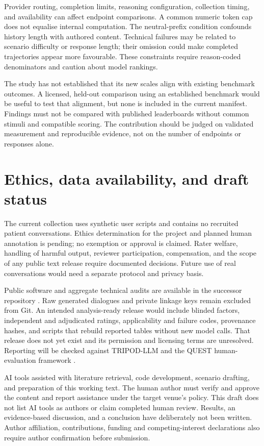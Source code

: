 \documentclass[11pt,a4paper]{article}
\begin{document}
Provider routing, completion limits, reasoning configuration, collection timing, and availability can affect endpoint comparisons. A common numeric token cap does not equalise internal computation. The neutral-prefix condition confounds history length with authored content. Technical failures may be related to scenario difficulty or response length; their omission could make completed trajectories appear more favourable. These constraints require reason-coded denominators and caution about model rankings.

The study has not established that its new scales align with existing benchmark outcomes. A licensed, held-out comparison using an established benchmark would be useful to test that alignment, but none is included in the current manifest. Findings must not be compared with published leaderboards without common stimuli and compatible scoring. The contribution should be judged on validated measurement and reproducible evidence, not on the number of endpoints or responses alone.

\section{Ethics, data availability, and draft status}

The current collection uses synthetic user scripts and contains no recruited patient conversations. Ethics determination for the project and planned human annotation is pending; no exemption or approval is claimed. Rater welfare, handling of harmful output, reviewer participation, compensation, and the scope of any public text release require documented decisions. Future use of real conversations would need a separate protocol and privacy basis.

Public software and aggregate technical audits are available in the successor repository \cite{software}. Raw generated dialogues and private linkage keys remain excluded from Git. An intended analysis-ready release would include blinded factors, independent and adjudicated ratings, applicability and failure codes, provenance hashes, and scripts that rebuild reported tables without new model calls. That release does not yet exist and its permission and licensing terms are unresolved. Reporting will be checked against TRIPOD-LLM and the QUEST human-evaluation framework \cite{gallifant,tam}.

AI tools assisted with literature retrieval, code development, scenario drafting, and preparation of this working text. The human author must verify and approve the content and report assistance under the target venue's policy. This draft does not list AI tools as authors or claim completed human review. Results, an evidence-based discussion, and a conclusion have deliberately not been written. Author affiliation, contributions, funding and competing-interest declarations also require author confirmation before submission.
\end{document}
